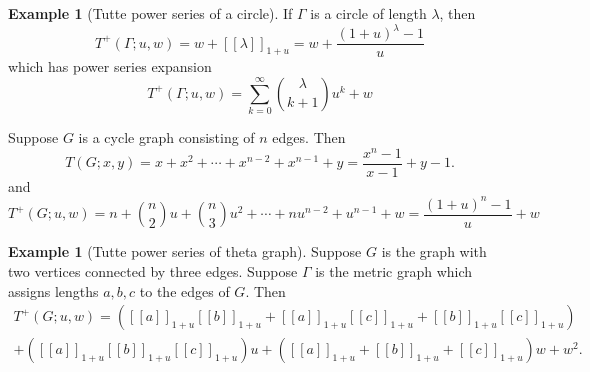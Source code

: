 \documentclass{amsart}
\theoremstyle{definition}
\newtheorem{eg}[thm]{Example}
\newcommand{\fanalog}[2]{[\![#2]\!]_{#1}}
\begin{document}
\begin{eg}[Tutte power series of a circle]
If $\Gamma$ is a circle of length $\lambda$, then 
\[
	T^+(\Gamma;u,w) = w + \fanalog{1 + u}{\lambda} = w + \frac{(1 + u)^\lambda - 1}{u}
\]
which has power series expansion
$$
T^+(\Gamma;u,w) = \sum_{k=0}^\infty \binom{\lambda}{k+1} u^{k} + w
$$

Suppose $G$ is a cycle graph consisting of $n$ edges.
Then
$$
T(G;x,y) = x + x^2 + \cdots + x^{n-2} + x^{n-1} + y 
= \frac{x^n - 1}{x - 1} + y - 1.
$$
and
$$
T^+(G;u,w) = n + \binom{n}{2}u + \binom{n}{3} u^2 + \cdots + nu^{n-2} + u^{n-1} + w
= \frac{(1+u)^n-1}{u} + w
$$
\end{eg}

\begin{eg}[Tutte power series of theta graph]
Suppose $G$ is the graph with two vertices connected by three edges.
Suppose $\Gamma$ is the metric graph which assigns lengths $a,b,c$ to the edges of $G$.
Then
\begin{multline*}
T^+(G;u,w) = ( \fanalog{1 + u}{a} \fanalog{1 + u}{b} + \fanalog{1 + u}{a} \fanalog{1 + u}{c} + \fanalog{1 + u}{b} \fanalog{1 + u}{c} ) \\
+ ( \fanalog{1 + u}{a} \fanalog{1 + u}{b} \fanalog{1 + u}{c} ) u 
+ (\fanalog{1 + u}{a} + \fanalog{1 + u}{b} + \fanalog{1 + u}{c}) w + w^2 .
\end{multline*}

\end{eg}
\end{document}

